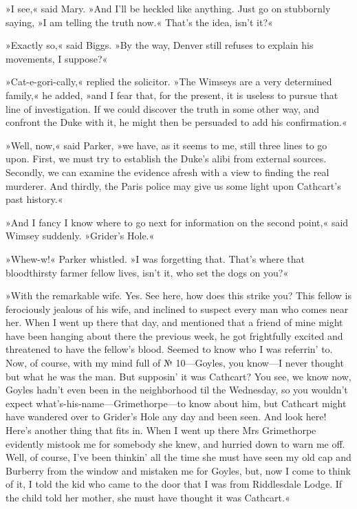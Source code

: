 »I see,« said Mary. »And I'll be heckled like anything. Just go on stubbornly saying, »I am telling the truth now.« That's the idea, isn't it?«

»Exactly so,« said Biggs. »By the way, Denver still refuses to explain his movements, I suppose?«

»Cat-e-gori-cally,« replied the solicitor. »The Wimseys are a very determined family,« he added, »and I fear that, for the present, it is useless to pursue that line of investigation. If we could discover the truth in some other way, and confront the Duke with it, he might then be persuaded to add his confirmation.«

»Well, now,« said Parker, »we have, as it seems to me, still three lines to go upon. First, we must try to establish the Duke's alibi from external sources. Secondly, we can examine the evidence afresh with a view to finding the real murderer. And thirdly, the Paris police may give us some light upon Cathcart's past history.«

»And I fancy I know where to go next for information on the second point,« said Wimsey suddenly. »Grider's Hole.«

»Whew-w!« Parker whistled. »I was forgetting that. That's where that bloodthirsty farmer fellow lives, isn't it, who set the dogs on you?«

»With the remarkable wife. Yes. See here, how does this strike you?  This fellow is ferociously jealous of his wife, and inclined to suspect every man who comes near her. When I went up there that day, and mentioned that a friend of mine might have been hanging about there the previous week, he got frightfully excited and threatened to have the fellow's blood. Seemed to know who I was referrin' to. Now, of course, with my mind full of № 10\allowbreak---\allowbreak Goyles, you know\allowbreak---\allowbreak I never thought but what he was the man. But supposin' it was Cathcart? You see, we know now, Goyles hadn't even been in the neighborhood til the Wednesday, so you wouldn't expect what's-his-name\allowbreak---\allowbreak Grimethorpe---to know about him, but Cathcart might have wandered over to Grider's Hole any day and been seen. And look here! Here's another thing that fits in. When I went up there Mrs Grimethorpe evidently mistook me for somebody she knew, and hurried down to warn me off. Well, of course, I've been thinkin' all the time she must have seen my old cap and Burberry from the window and mistaken me for Goyles, but, now I come to think of it, I told the kid who came to the door that I was from Riddlesdale Lodge. If the child told her mother, she must have thought it was Cathcart.«

